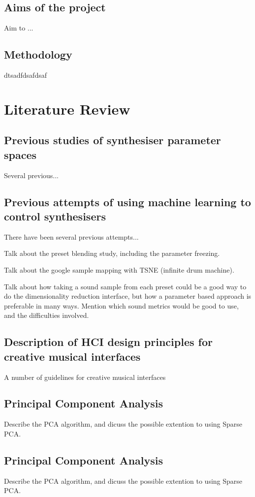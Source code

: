 \documentclass[11pt, oneside]{report}   	%
\begin{document}
\section{Aims of the project}
Aim to ...


\section{Methodology}
dtsadfdsafdsaf

\chapter{Literature Review}
\section{Previous studies of synthesiser parameter spaces}
Several previous...
\section{Previous attempts of using machine learning to control synthesisers}
There have been several previous attempts...

Talk about the preset blending study, including the parameter freezing.



Talk about the google sample mapping with TSNE (infinite drum machine).

Talk about how taking a sound sample from each preset could be a good way to do the dimensionality reduction interface, but how a parameter based approach is preferable in many ways. Mention which sound metrics would be good to use, and the difficulties involved.
\section{Description of HCI design principles for creative musical interfaces}
A number of guidelines for creative musical interfaces

\section{Principal Component Analysis}
Describe the PCA algorithm, and dicuss the possible extention to using Sparse PCA. 

\section{Principal Component Analysis}
Describe the PCA algorithm, and dicuss the possible extention to using Sparse PCA. 
\end{document}
